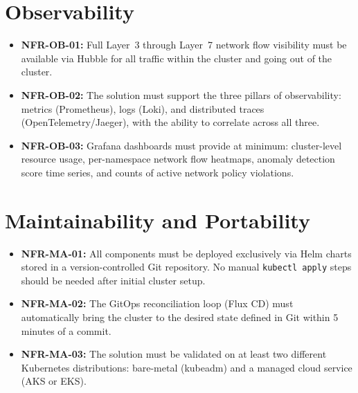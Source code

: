 \section{Observability}

\begin{itemize}
    \item \textbf{NFR-OB-01:} Full Layer~3 through Layer~7 network flow visibility must be available via Hubble for all traffic within the cluster and going out of the cluster.
    \item \textbf{NFR-OB-02:} The solution must support the three pillars of observability: metrics (Prometheus), logs (Loki), and distributed traces (OpenTelemetry/Jaeger), with the ability to correlate across all three.
    \item \textbf{NFR-OB-03:} Grafana dashboards must provide at minimum: cluster-level resource usage, per-namespace network flow heatmaps, anomaly detection score time series, and counts of active network policy violations.
\end{itemize}

\section{Maintainability and Portability}

\begin{itemize}
    \item \textbf{NFR-MA-01:} All components must be deployed exclusively via Helm charts stored in a version-controlled Git repository. No manual \texttt{kubectl apply} steps should be needed after initial cluster setup.
    \item \textbf{NFR-MA-02:} The GitOps reconciliation loop (Flux CD) must automatically bring the cluster to the desired state defined in Git within 5 minutes of a commit.
    \item \textbf{NFR-MA-03:} The solution must be validated on at least two different Kubernetes distributions: bare-metal (kubeadm) and a managed cloud service (AKS or EKS).
\end{itemize}